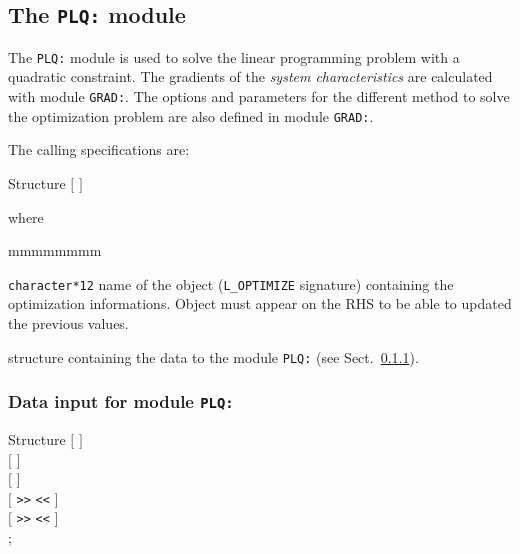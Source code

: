 \subsection{The \texttt{PLQ:} module}

The {\tt PLQ:} module is used to solve the linear programming problem with a quadratic constraint. The gradients of the {\sl system
characteristics} are calculated with module {\tt GRAD:}. The options and parameters for the different method to solve the optimization problem
are also defined in module {\tt GRAD:}.

\vskip 0.08cm

The calling specifications are:

\begin{DataStructure}{Structure }
 \moc{:=}  $[$  $]$ \moc{::} 
\end{DataStructure}

\noindent where

\begin{ListeDeDescription}{mmmmmmmm}

\item[\dusa{OPTIM}] \texttt{character*12} name of the  object ({\tt L\_OPTIMIZE} signature) containing the
optimization informations. Object  must appear on the RHS to be able to updated the previous values.

\item[\dstr{plq\_data}] structure containing the data to the module \texttt{PLQ:} (see Sect.~\ref{sect:plq_data}).

\end{ListeDeDescription}
\vskip 0.2cm

\subsubsection{Data input for module \texttt{PLQ:}}\label{sect:plq_data}

\begin{DataStructure}{Structure }
$[$   $]$ \\
$[$  $]$ \\
 $[$  $]$ \\
$[$  {\tt >>}  {\tt <<} $]$ \\
$[$  {\tt >>}  {\tt <<} $]$ \\
;
\end{DataStructure}

